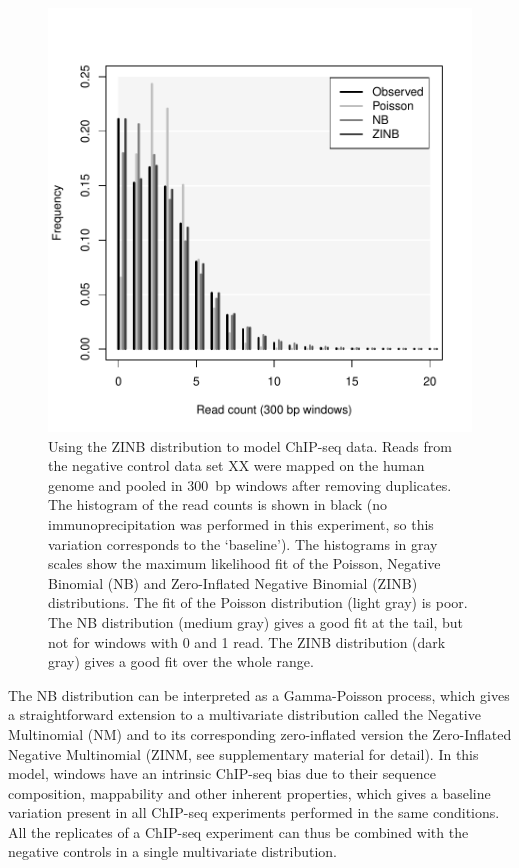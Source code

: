 \documentclass{bioinfo}
\begin{document}
\begin{methods}
\begin{figure}[!tpb]
\centerline{\includegraphics[scale=0.55]{ZINB_fit.pdf}}
\caption{Using the ZINB distribution to model ChIP-seq data. Reads from
the negative control data set XX were mapped on the human genome and pooled
in 300~bp windows after removing duplicates. The histogram of the read
counts is shown in black (no immunoprecipitation was performed in this
experiment, so this variation corresponds to the `baseline'). The
histograms in gray scales show the maximum likelihood fit of the Poisson,
Negative Binomial (NB) and Zero-Inflated Negative Binomial (ZINB)
distributions. The fit of the Poisson distribution (light gray) is poor.
The NB distribution (medium gray) gives a good fit at the tail, but not
for windows with 0 and 1 read. The ZINB distribution (dark gray) gives
a good fit over the whole range.
}\label{fig:ZINB_fit}
\end{figure}

The NB distribution can be interpreted as a Gamma-Poisson process,
which gives a straightforward extension to a multivariate
distribution called the Negative Multinomial (NM) and to its
corresponding zero-inflated version the Zero-Inflated Negative
Multinomial (ZINM, see supplementary material for detail). In this model,
windows have an intrinsic ChIP-seq bias due to their sequence composition,
mappability and other inherent properties, which gives a baseline
variation present in all ChIP-seq experiments performed in the same
conditions. All the replicates of a ChIP-seq experiment can thus be
combined with the negative controls in a single multivariate
distribution.


\end{methods}
\end{document}
